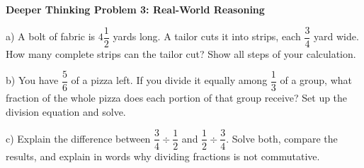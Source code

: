 \documentclass[12pt, letterpaper, fleql]{article}
\begin{document}
\begin{tcolorbox}[colback=white, colframe=black, boxrule=1pt, arc=4mm, left=6mm, right=6mm, top=5mm, bottom=5mm]
\textbf{Deeper Thinking Problem 3: Real-World Reasoning}

\medskip

\noindent
a) A bolt of fabric is $4\dfrac{1}{2}$ yards long. A tailor cuts it into strips, each $\dfrac{3}{4}$ yard wide. How many complete strips can the tailor cut? Show all steps of your calculation.

\vspace{5cm}

\noindent
b) You have $\dfrac{5}{6}$ of a pizza left. If you divide it equally among $\dfrac{1}{3}$ of a group, what fraction of the whole pizza does each portion of that group receive? Set up the division equation and solve.

\vspace{5cm}

\noindent
c) Explain the difference between $\dfrac{3}{4} \div \dfrac{1}{2}$ and $\dfrac{1}{2} \div \dfrac{3}{4}$. Solve both, compare the results, and explain in words why dividing fractions is not commutative.

\vspace{5cm}
\end{tcolorbox}
\end{document}
